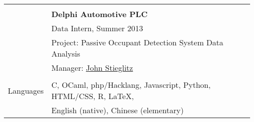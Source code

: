 \documentclass[letterpaper,11pt,oneside]{article}
\begin{document}
\begin{tabular}{@{} l l}
     & \\
     & \textbf{Delphi Automotive PLC} \\
     & Data Intern, Summer 2013 \\
     & Project: Passive Occupant Detection System Data Analysis \\
     & Manager: \href{https://www.linkedin.com/in/john-stieglitz-62717610}{John Stieglitz} \\
     & \\
  \Large{Languages}   & C, OCaml, php/Hacklang, Javascript, Python, HTML/CSS, R, \LaTeX, \\
  & English (native), Chinese (elementary) \\
\end{tabular}
\end{document}
